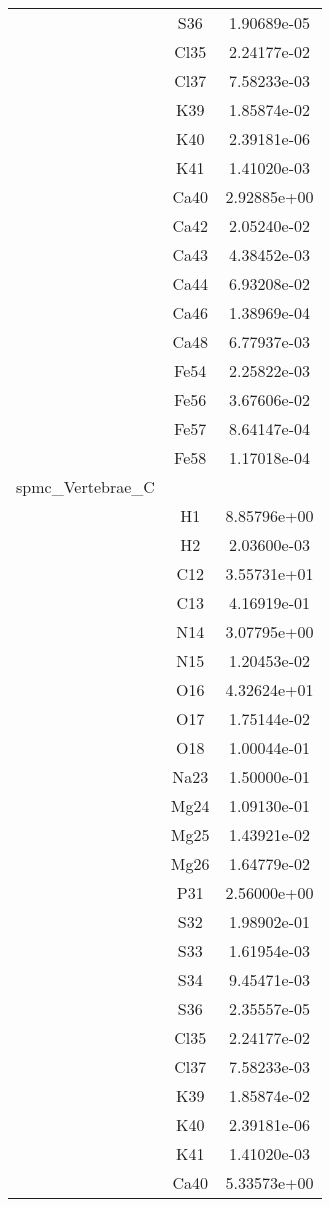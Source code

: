 \begin{centering}
\begin{longtable}{l c c}
& S36 & 1.90689e-05 \\ 
& Cl35 & 2.24177e-02 \\ 
& Cl37 & 7.58233e-03 \\ 
& K39 & 1.85874e-02 \\ 
& K40 & 2.39181e-06 \\ 
& K41 & 1.41020e-03 \\ 
& Ca40 & 2.92885e+00 \\ 
& Ca42 & 2.05240e-02 \\ 
& Ca43 & 4.38452e-03 \\ 
& Ca44 & 6.93208e-02 \\ 
& Ca46 & 1.38969e-04 \\ 
& Ca48 & 6.77937e-03 \\ 
& Fe54 & 2.25822e-03 \\ 
& Fe56 & 3.67606e-02 \\ 
& Fe57 & 8.64147e-04 \\ 
& Fe58 & 1.17018e-04 \\ 
\hline
spmc_Vertebrae_C & & \\
\hline
& H1 & 8.85796e+00 \\ 
& H2 & 2.03600e-03 \\ 
& C12 & 3.55731e+01 \\ 
& C13 & 4.16919e-01 \\ 
& N14 & 3.07795e+00 \\ 
& N15 & 1.20453e-02 \\ 
& O16 & 4.32624e+01 \\ 
& O17 & 1.75144e-02 \\ 
& O18 & 1.00044e-01 \\ 
& Na23 & 1.50000e-01 \\ 
& Mg24 & 1.09130e-01 \\ 
& Mg25 & 1.43921e-02 \\ 
& Mg26 & 1.64779e-02 \\ 
& P31 & 2.56000e+00 \\ 
& S32 & 1.98902e-01 \\ 
& S33 & 1.61954e-03 \\ 
& S34 & 9.45471e-03 \\ 
& S36 & 2.35557e-05 \\ 
& Cl35 & 2.24177e-02 \\ 
& Cl37 & 7.58233e-03 \\ 
& K39 & 1.85874e-02 \\ 
& K40 & 2.39181e-06 \\ 
& K41 & 1.41020e-03 \\ 
& Ca40 & 5.33573e+00 \\ 

\end{longtable}
\end{centering}
